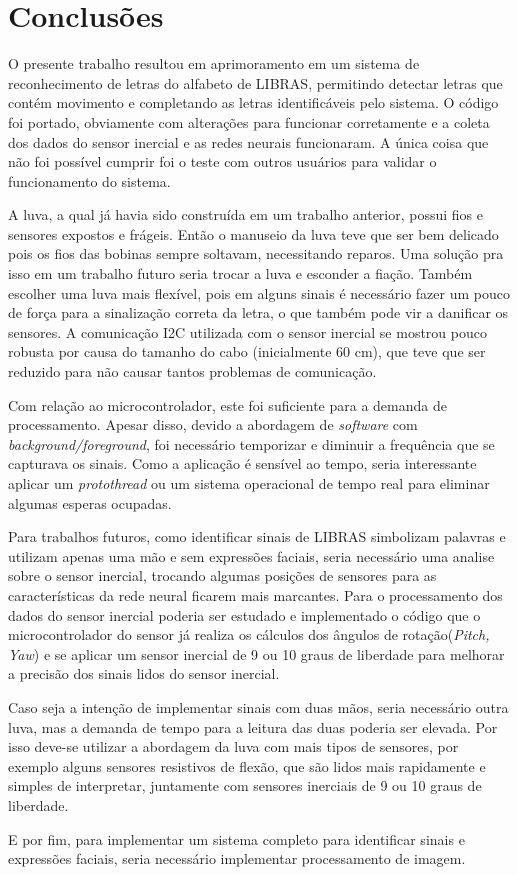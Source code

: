 \chapter{Conclusões}

	O presente trabalho resultou em aprimoramento em um sistema de reconhecimento de letras do alfabeto de LIBRAS, permitindo detectar letras que contém movimento e completando as letras identificáveis pelo sistema. O código foi portado, obviamente com alterações para funcionar corretamente e a coleta dos dados do sensor inercial e as redes neurais funcionaram. A única coisa que não foi possível cumprir foi o teste com outros usuários para validar o funcionamento do sistema.


    A luva, a qual já havia sido construída em um trabalho anterior, possui fios e sensores expostos e frágeis. Então o manuseio da luva teve que ser bem delicado pois os fios das bobinas sempre soltavam, necessitando reparos. Uma solução pra isso em um trabalho futuro seria trocar a luva e esconder a fiação. Também escolher uma luva mais flexível, pois em alguns sinais é necessário fazer um pouco de força para a sinalização correta da letra, o que também pode vir a danificar os sensores. A comunicação I2C utilizada com o sensor inercial se mostrou pouco robusta por causa do tamanho do cabo (inicialmente 60 cm), que teve que ser reduzido para não causar tantos problemas de comunicação.
    
    Com relação ao microcontrolador, este foi suficiente para a demanda de processamento. Apesar disso, devido a abordagem de \textit{software} com \textit{background/foreground}, foi necessário temporizar e diminuir a frequência que se capturava os sinais. Como a aplicação é sensível ao tempo, seria interessante aplicar um \textit{protothread} ou um sistema operacional de tempo real para eliminar algumas esperas ocupadas.
    
    Para trabalhos futuros, como identificar sinais de LIBRAS simbolizam palavras e utilizam apenas uma mão e sem expressões faciais, seria necessário uma analise sobre o sensor inercial, trocando algumas posições de sensores para as características da rede neural ficarem mais marcantes. Para o processamento dos dados do sensor inercial poderia ser estudado e implementado o código que o microcontrolador do sensor já realiza os cálculos dos ângulos de rotação(\textit{Pitch, Yaw}) e se aplicar um sensor inercial de 9 ou 10 graus de liberdade para melhorar a precisão dos sinais lidos do sensor inercial.

    Caso seja a intenção de implementar sinais com duas mãos, seria necessário outra luva, mas a demanda de tempo para a leitura das duas poderia ser elevada. Por isso deve-se utilizar a abordagem da luva com mais tipos de sensores, por exemplo alguns sensores resistivos de flexão, que são lidos mais rapidamente e simples de interpretar, juntamente com sensores inerciais de 9 ou 10 graus de liberdade.
    
    E  por fim, para implementar um sistema completo para identificar sinais e expressões faciais, seria necessário implementar processamento de imagem.
    
